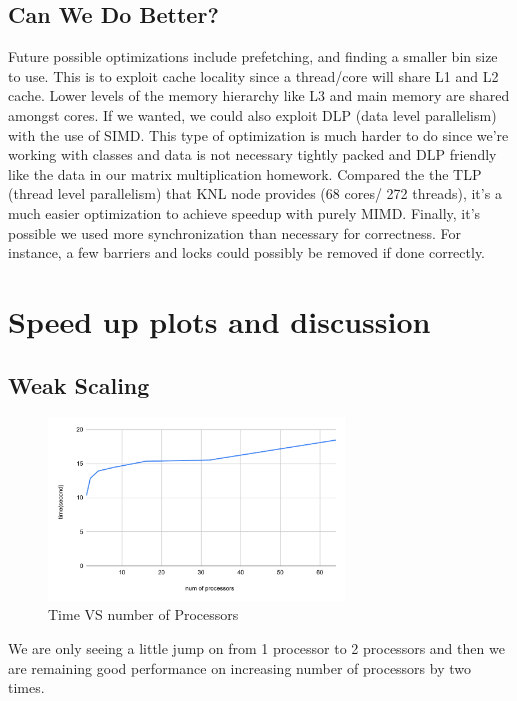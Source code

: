 \documentclass{article}
\begin{document}
\subsection{Can We Do Better?}
Future possible optimizations include prefetching, and finding a smaller bin size to use. This is to exploit cache locality since a thread/core will share L1 and L2 cache. Lower levels of the memory hierarchy like L3 and main memory are shared amongst cores. If we wanted, we could also exploit DLP (data level parallelism) with the use of SIMD. This type of optimization is much harder to do since we're working with classes and data is not necessary tightly packed and DLP friendly like the data in our matrix multiplication homework. Compared the the TLP (thread level parallelism) that KNL node provides (68 cores/ 272 threads), it's a much easier optimization to achieve speedup with purely MIMD. Finally, it's possible we used more synchronization than necessary for correctness. For instance, a few barriers and locks
could possibly be removed if done correctly.

\section{Speed up plots and discussion}
\subsection{Weak Scaling}
\begin{figure}[H] %
\centering %
\includegraphics[width=0.7\textwidth]{time_vs_num_processor_weak.pdf} %
\caption{Time VS number of Processors} %
\label{Time VS number of Processors} %
\end{figure}

We are only seeing a little jump on from 1 processor to 2 processors and then we are remaining good performance on increasing number of processors by two times.
\end{document}
